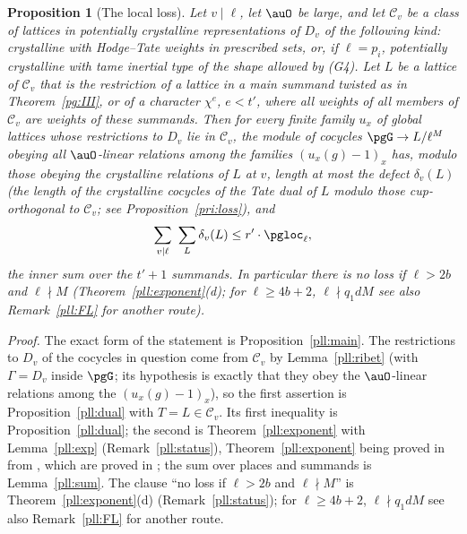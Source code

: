 \documentclass[10pt]{amsart}
\newtheorem{proposition}[theorem]{Proposition}
\theoremstyle{definition}
\theoremstyle{remark}
\begin{document}
\begin{proposition}[The local loss]\label{pg:loss}
Let $v\mid\ell$, let $\auO$ be large, and let $\mathcal C_v$ be a class of lattices in potentially
crystalline representations of $D_v$ of the following kind: crystalline with Hodge--Tate weights in
prescribed sets, or, if $\ell=p_i$, potentially crystalline with tame inertial type of the shape
allowed by (G4). Let $L$ be a lattice of $\mathcal C_v$ that is the restriction of a lattice in a
main summand twisted as in Theorem~\ref{pg:III}, or of a character $\chi^e$, $e<t'$, where all
weights of all members of $\mathcal C_v$ are weights of these summands. Then for every finite family $u_x$ of global lattices whose restrictions to $D_v$ lie in $\mathcal C_v$, the module of cocycles $\pgG\to L/\ell^M$ obeying all $\auO$-linear relations among the families $(u_x(g)-1)_x$ has, modulo those obeying the crystalline relations of $L$ at $v$, length at most the \emph{defect} $\delta_v(L)$ (the length of the crystalline cocycles of the Tate dual of $L$ modulo those cup-orthogonal to $\mathcal C_v$; see Proposition~\ref{pri:loss}),
and
\[
\sum_{v\mid\ell}\ \sum_{L}\delta_v(L)\le r'\cdot\pgloc_\ell ,
\]
the inner sum over the $t'+1$ summands. In particular there is no loss if $\ell>2b$ and $\ell\nmid M$ (Theorem~\ref{pll:exponent}(d); for $\ell\ge4b+2$, $\ell\nmid q_1dM$ see also Remark~\ref{pll:FL} for another route).
\end{proposition}
\smallskip\noindent\emph{Proof.} The exact form of the statement is Proposition~\ref{pll:main}. The
restrictions to $D_v$ of the cocycles in question come from $\mathcal C_v$ by Lemma~\ref{pll:ribet}
(with $\Gamma=D_v$ inside $\pgG$; its hypothesis is exactly that they obey the $\auO$-linear relations
among the $(u_x(g)-1)_x$), so the first assertion is Proposition~\ref{pll:dual} with $T=L\in\mathcal C_v$. Its
first inequality is Proposition~\ref{pll:dual}; the second is Theorem~\ref{pll:exponent} with
Lemma~\ref{pll:exp} (Remark~\ref{pll:status}), Theorem~\ref{pll:exponent} being proved in
{\cite[\S2.3]{P56}} from {\cite[Propositions~2.5--2.10]{P56}}, which are proved in
{\cite[\S\S7, 8.1 and~8.2]{P56}}; the sum over places and summands is
Lemma~\ref{pll:sum}. The clause ``no loss if $\ell>2b$ and $\ell\nmid M$'' is
Theorem~\ref{pll:exponent}(d) (Remark~\ref{pll:status}); for $\ell\ge4b+2$, $\ell\nmid q_1dM$ see
also Remark~\ref{pll:FL} for another route.\par\smallskip
\end{document}
